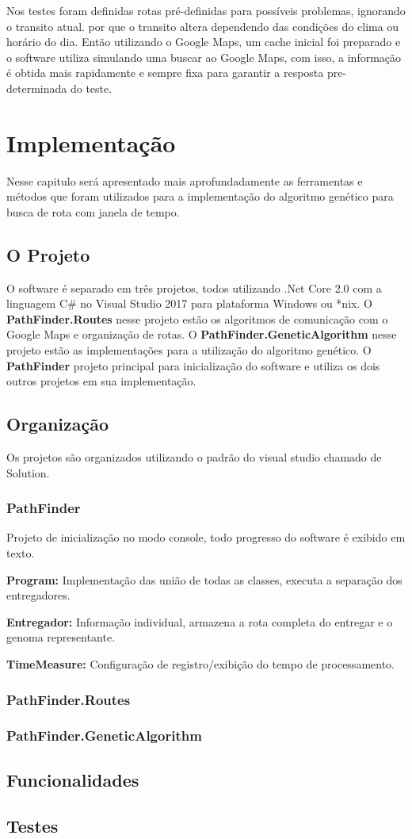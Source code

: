 Nos testes foram definidas rotas pré-definidas para possíveis problemas, ignorando o transito atual. por que o transito altera dependendo das condições do clima ou horário do dia. Então utilizando o Google Maps, um cache inicial foi preparado e o software utiliza simulando uma buscar ao Google Maps, com isso, a informação é obtida mais rapidamente e sempre fixa para garantir a resposta pre-determinada do teste.

\chapter{Implementação}
 
Nesse capitulo será apresentado mais aprofundadamente as ferramentas e métodos que foram utilizados para a implementação do algoritmo genético para busca de rota com janela de tempo.
 
\section{O Projeto}
O software é separado em três projetos, todos utilizando .Net Core 2.0 com a linguagem C\# no Visual Studio 2017 para plataforma Windows ou \**nix.
O \textbf{PathFinder.Routes} nesse projeto estão os algoritmos de comunicação com o Google Maps e organização de rotas. 
O \textbf{PathFinder.GeneticAlgorithm} nesse projeto estão as implementações para a utilização do algoritmo genético.
O \textbf{PathFinder} projeto principal para inicialização do software e utiliza os dois outros projetos em sua implementação.

\section{Organização}
Os projetos são organizados utilizando o padrão do visual studio chamado de Solution.

\subsection{PathFinder}
Projeto de inicialização no modo console, todo progresso do software é exibido em texto.

\textbf{Program:} Implementação das união de todas as classes, executa a separação dos entregadores.

\textbf{Entregador:} Informação individual, armazena a rota completa do entregar e o genoma representante.

\textbf{TimeMeasure:} Configuração de registro/exibição do tempo de processamento.
\subsection{PathFinder.Routes}

\subsection{PathFinder.GeneticAlgorithm}


\section{Funcionalidades}

\section{Testes}